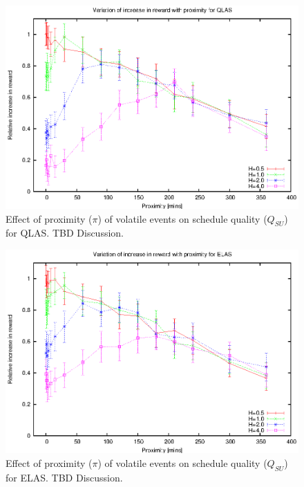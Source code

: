 

\begin{figure}[htbp]
\begin{center}
    \includegraphics[scale=1.0, angle=0]{figures/vdv.eps}
\end{center}
\caption[Effect of proximity ($\pi$) of volatile events on schedule quality ($Q_{SU}$) for QLAS.]
{Effect of proximity ($\pi$) of volatile events on schedule quality ($Q_{SU}$) for QLAS. TBD Discussion.}
\label{fig:vol_qlas_pi}
\end{figure}


\begin{figure}[htbp]
\begin{center}
    \includegraphics[scale=1.0, angle=0]{figures/edv.eps}
\end{center}
\caption[Effect of proximity ($\pi$) of volatile events on schedule quality ($Q_{SU}$) for ELAS.]
{Effect of proximity ($\pi$) of volatile events on schedule quality ($Q_{SU}$) for ELAS. TBD Discussion.}
\label{fig:vol_elas_pi}
\end{figure}

